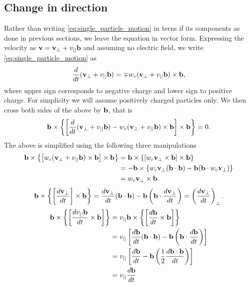 \documentclass[a4paper,11pt]{report}
\begin{document}
\subsection{Change in direction}
Rather than writing \cref{eq:single_particle_motion} in terns if its components as done in previous sections, we leave the equation in vector form. Expressing the velocity as $\mathbf{v} = \mathbf{v}_\perp + v_{||} \mathbf{b}$ and assuming no electric field, we write \cref{eq:single_particle_motion} as
\begin{equation}
    \frac{d}{dt} ( \mathbf{v}_\perp + v_{||} \mathbf{b}) = \mp w_c (\mathbf{v}_\perp + v_{||} \mathbf{b} ) \times \mathbf{b},
\end{equation}
where upper sign corresponds to negative charge and lower sign to positive charge. For simplicity we will assume positively charged particles only. We then cross both sides of the above by $\mathbf{b}$, that is
\begin{equation}
    \mathbf{b} \times \left \{ \left [ \frac{d}{dt} ( \mathbf{v}_\perp + v_{||} \mathbf{b}) - w_c ( \mathbf{v}_\perp + v_{||} \mathbf{b}) \times \mathbf{b} \right ] \times \mathbf{b} \right \} = 0.
\end{equation}
The above is simplified using the following three manipulations
\begin{align}
    \mathbf{b} \times \left \{ \left [ w_c ( \mathbf{v}_\perp + v_{||} \mathbf{b}) \times \mathbf{b} \right ] \times \mathbf{b} \right \} &= \mathbf{b} \times \left \{ \left [ w_c \mathbf{v}_\perp \times \mathbf{b} \right ] \times \mathbf{b} \right \} \nonumber \\
    & = -\mathbf{b} \times \left \{ w_c \mathbf{v}_\perp ( \mathbf{b} \cdot \mathbf{b}) - \mathbf{b} (\mathbf{b} \cdot w_c \mathbf{v}_\perp ) \right \} \nonumber \\
    & = w_c \mathbf{v}_\perp \times \mathbf{b}.
\end{align}
\begin{equation}
    \mathbf{b} \times \left \{ \left [ \frac{d\mathbf{v}_\perp}{dt} \right ] \times \mathbf{b} \right \} = \frac{d \mathbf{v}_\perp}{dt}( \mathbf{b} \cdot \mathbf{b}) - \mathbf{b} \left ( \mathbf{b} \cdot \frac{d\mathbf{v}_\perp}{dt} \right ) = \left ( \frac{d \mathbf{v}_\perp}{dt} \right )_\perp.
\end{equation}
\begin{align}
    \mathbf{b} \times \left \{ \left [ \frac{d v_{||} \mathbf{b}}{dt} \times \mathbf{b} \right ] \right \} &= v_{||} \mathbf{b} \times \left \{ \left [ \frac{ d\mathbf{b}}{dt} \times \mathbf{b} \right ] \right \} \nonumber \\
    & = v_{||} \left [ \frac{d \mathbf{b}}{dt} ( \mathbf{b} \cdot \mathbf{b}) - \mathbf{b} \left ( \mathbf{b} \cdot \frac{d \mathbf{b}}{dt} \right ) \right ] \nonumber \\
    & = v_{||} \left [ \frac{d \mathbf{b}}{dt} - \mathbf{b} \left ( \frac{1}{2} \frac{d \mathbf{b} \cdot \mathbf{b}}{dt} \right ) \right ] \nonumber \\
    & = v_{||} \frac{d \mathbf{b}}{dt}
\end{align}
\end{document}
